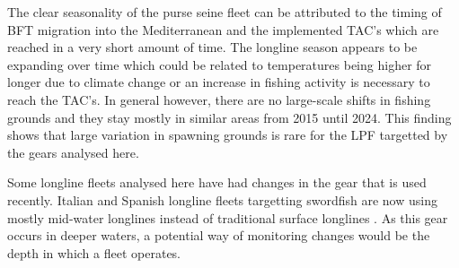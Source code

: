 The clear seasonality of the purse seine fleet can be attributed to the timing of BFT migration
into the Mediterranean and the implemented TAC's which are reached in a very short amount of time.
The longline season appears to be expanding over time which could be related to temperatures being
higher for longer due to climate change or an increase in fishing activity is necessary to reach
the TAC's. In general however, there are no large-scale shifts in fishing grounds and they stay
mostly in similar areas from 2015 until 2024. This finding shows that large variation in spawning
grounds is rare for the LPF targetted by the gears analysed here.

Some longline fleets analysed here have had changes in the gear that is used recently. Italian and
Spanish longline fleets targetting swordfish are now using mostly mid-water longlines instead of
traditional surface longlines \citep{swo_gear_italy,spain_swo_gear}. As this gear occurs in deeper
waters, a potential way of monitoring changes would be the depth in which a fleet operates.

